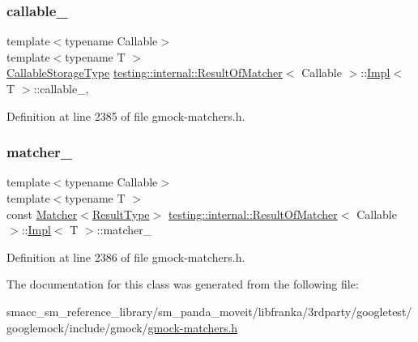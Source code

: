 \subsubsection{\texorpdfstring{callable\+\_\+}{callable\_}}
{\footnotesize\ttfamily template$<$typename Callable$>$ \\
template$<$typename T $>$ \\
\hyperlink{classtesting_1_1internal_1_1ResultOfMatcher_a6f7f7d80162bebdf73681d6a3aa92c7d}{Callable\+Storage\+Type} \hyperlink{classtesting_1_1internal_1_1ResultOfMatcher}{testing\+::internal\+::\+Result\+Of\+Matcher}$<$ Callable $>$\+::\hyperlink{classtesting_1_1internal_1_1ResultOfMatcher_1_1Impl}{Impl}$<$ T $>$\+::callable\+\_\+\hspace{0.3cm}{\ttfamily [mutable]}, {\ttfamily [private]}}



Definition at line 2385 of file gmock-\/matchers.\+h.

\mbox{\label{classtesting_1_1internal_1_1ResultOfMatcher_1_1Impl_a2ce504e44dae05b5e574e21def4f1cba}} 
\subsubsection{\texorpdfstring{matcher\+\_\+}{matcher\_}}
{\footnotesize\ttfamily template$<$typename Callable$>$ \\
template$<$typename T $>$ \\
const \hyperlink{classtesting_1_1Matcher}{Matcher}$<$\hyperlink{classtesting_1_1internal_1_1ResultOfMatcher_aa9db2267792fcae2cfa3f57683f4e048}{Result\+Type}$>$ \hyperlink{classtesting_1_1internal_1_1ResultOfMatcher}{testing\+::internal\+::\+Result\+Of\+Matcher}$<$ Callable $>$\+::\hyperlink{classtesting_1_1internal_1_1ResultOfMatcher_1_1Impl}{Impl}$<$ T $>$\+::matcher\+\_\+\hspace{0.3cm}{\ttfamily [private]}}



Definition at line 2386 of file gmock-\/matchers.\+h.



The documentation for this class was generated from the following file\+:\begin{DoxyCompactItemize}
\item 
smacc\+\_\+sm\+\_\+reference\+\_\+library/sm\+\_\+panda\+\_\+moveit/libfranka/3rdparty/googletest/googlemock/include/gmock/\hyperlink{gmock-matchers_8h}{gmock-\/matchers.\+h}\end{DoxyCompactItemize}
